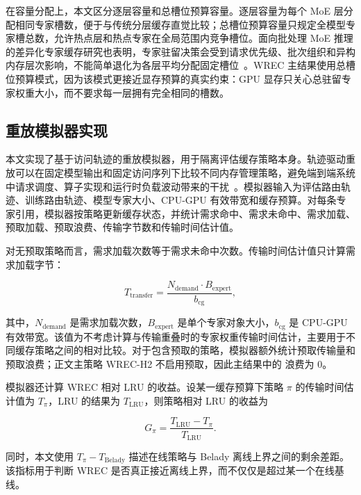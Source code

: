 在容量分配上，本文区分逐层容量和总槽位预算容量。逐层容量为每个 MoE 层分配相同专家槽数，便于与传统分层缓存直觉比较；总槽位预算容量只规定全模型专家槽总数，允许热点层和热点专家在全局范围内竞争槽位。面向批处理 MoE 推理的差异化专家缓存研究也表明，专家驻留决策会受到请求优先级、批次组织和异构内存层次影响，不能简单退化为各层平均分配固定槽位~\cite{li2025diffmoe}。WREC 主结果使用总槽位预算模式，因为该模式更接近显存预算的真实约束：GPU 显存只关心总驻留专家权重大小，而不要求每一层拥有完全相同的槽数。

\subsection{重放模拟器实现}

本文实现了基于访问轨迹的重放模拟器，用于隔离评估缓存策略本身。轨迹驱动重放可以在固定模型输出和固定访问序列下比较不同内存管理策略，避免端到端系统中请求调度、算子实现和运行时负载波动带来的干扰~\cite{sheng2023flexgen,kwon2023pagedattention,xue2024moeinfinity}。模拟器输入为评估路由轨迹、训练路由轨迹、模型专家大小、CPU-GPU 有效带宽和缓存预算。对每条专家引用，模拟器按策略更新缓存状态，并统计需求命中、需求未命中、需求加载、预取加载、预取浪费、传输字节数和传输时间估计值。

对无预取策略而言，需求加载次数等于需求未命中次数。传输时间估计值只计算需求加载字节：

\begin{equation}
    \label{equ:wrec-transfer-time}
    T_{\mathrm{transfer}}=
    \frac{N_{\mathrm{demand}}\cdot B_{\mathrm{expert}}}{b_{\mathrm{cg}}},
\end{equation}

其中，$N_{\mathrm{demand}}$ 是需求加载次数，$B_{\mathrm{expert}}$ 是单个专家对象大小，$b_{\mathrm{cg}}$ 是 CPU-GPU 有效带宽。该值为不考虑计算与传输重叠时的专家权重传输时间估计，主要用于不同缓存策略之间的相对比较。对于包含预取的策略，模拟器额外统计预取传输量和预取浪费；正文主策略 WREC-H2 不启用预取，因此主结果中的 浪费为 $0$。

模拟器还计算 WREC 相对 LRU 的收益。设某一缓存预算下策略 $\pi$ 的传输时间估计值为 $T_\pi$，LRU 的结果为 $T_{\mathrm{LRU}}$，则策略相对 LRU 的收益为

\begin{equation}
    \label{equ:wrec-gain}
    G_{\pi}=\frac{T_{\mathrm{LRU}}-T_{\pi}}{T_{\mathrm{LRU}}}.
\end{equation}

同时，本文使用 $T_\pi-T_{\mathrm{Belady}}$ 描述在线策略与 Belady 离线上界之间的剩余差距。该指标用于判断 WREC 是否真正接近离线上界，而不仅仅是超过某一个在线基线。


